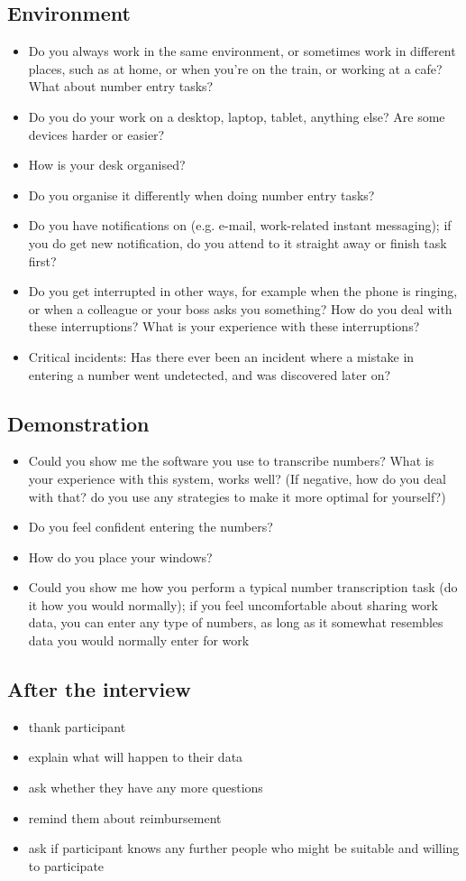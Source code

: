 \subsection{Environment}
\begin{itemize}
\item Do you always work in the same environment, or sometimes work in different places, such as at home, or when you're on the train, or working at a cafe? What about number entry tasks?
\item Do you do your work on a desktop, laptop, tablet, anything else? Are some devices harder or easier?
\item How is your desk organised?
\item Do you organise it differently when doing number entry tasks?
\item Do you have notifications on (e.g. e-mail, work-related instant messaging); if you do get new notification, do you attend to it straight away or finish task first?
\item Do you get interrupted in other ways, for example when the phone is ringing, or when a colleague or your boss asks you something? How do you deal with these interruptions? What is your experience with these interruptions?
\item Critical incidents: Has there ever been an incident where a mistake in entering a number went undetected, and was discovered later on?
\end{itemize}

\subsection{Demonstration}
\begin{itemize}
\item Could you show me the software you use to transcribe numbers?
What is your experience with this system, works well?
(If negative, how do you deal with that? do you use any strategies to make it more optimal for yourself?)
\item Do you feel confident entering the numbers?
\item How do you place your windows?
\item Could you show me how you perform a typical number transcription task (do it how you would normally); if you feel uncomfortable about sharing work data, you can enter any type of numbers, as long as it somewhat resembles data you would normally enter for work
\end{itemize}
\subsection{After the interview}
\begin{itemize}
\item thank participant
\item explain what will happen to their data
\item ask whether they have any more questions
\item remind them about reimbursement
\item ask if participant knows any further people who might be suitable and willing to participate
\end{itemize}

